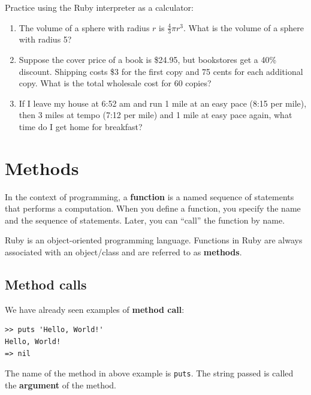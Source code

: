 \documentclass[10pt]{book}
\begin{document}
\begin{exercise}

Practice using the Ruby interpreter as a calculator: 

\begin{enumerate}

\item The volume of a sphere with radius $r$ is $\frac{4}{3} \pi r^3$.
  What is the volume of a sphere with radius 5?

\item Suppose the cover price of a book is \$24.95, but bookstores get a
  40\% discount.  Shipping costs \$3 for the first copy and 75 cents
  for each additional copy.  What is the total wholesale cost for
  60 copies?

\item If I leave my house at 6:52 am and run 1 mile at an easy pace
  (8:15 per mile), then 3 miles at tempo (7:12 per mile) and 1 mile at
  easy pace again, what time do I get home for breakfast?

\end{enumerate}
\end{exercise}


\chapter{Methods}
\label{methodchap}

In the context of programming, a {\bf function} is a named sequence of
statements that performs a computation.  When you define a function,
you specify the name and the sequence of statements.  Later, you can
``call'' the function by name.

Ruby is an object-oriented programming language.  Functions in Ruby are
always associated with an object/class and are referred to as {\bf methods}.

\section{Method calls}

We have already seen examples of {\bf method call}:

\begin{verbatim}
>> puts 'Hello, World!'
Hello, World!
=> nil
\end{verbatim}
%
The name of the method in above example is {\tt puts}.  The string passed
is called the {\bf argument} of the method.
\end{document}
